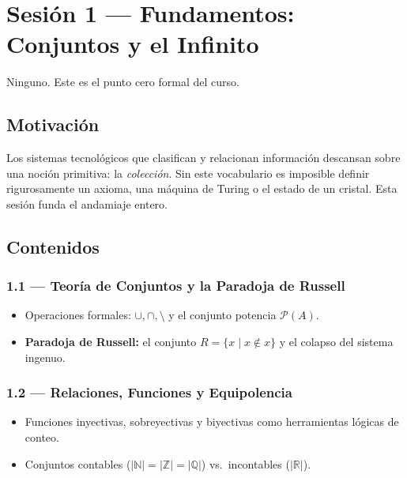 \documentclass[11pt, letterpaper]{article}
\begin{document}
\newpage

\section{Sesi\'on 1 --- Fundamentos: Conjuntos y el Infinito}

\begin{prereqs}
Ninguno. Este es el punto cero formal del curso.
\end{prereqs}

\subsection*{Motivaci\'on}
Los sistemas tecnol\'ogicos que clasifican y relacionan informaci\'on descansan sobre una noci\'on primitiva: la \emph{colecci\'on}. Sin este vocabulario es imposible definir rigurosamente un axioma, una m\'aquina de Turing o el estado de un cristal. Esta sesi\'on funda el andamiaje entero.

\subsection{Contenidos}

\subsubsection{1.1 --- Teor\'ia de Conjuntos y la Paradoja de Russell}
\begin{itemize}
  \item Operaciones formales: $\cup, \cap, \setminus$ y el conjunto potencia $\mathcal{P}(A)$.
  \item \textbf{Paradoja de Russell:} el conjunto $R=\{x \mid x\notin x\}$ y el colapso del sistema ingenuo.
\end{itemize}

\subsubsection{1.2 --- Relaciones, Funciones y Equipolencia}
\begin{itemize}
  \item Funciones inyectivas, sobreyectivas y biyectivas como herramientas l\'ogicas de conteo.
  \item Conjuntos contables ($|\mathbb{N}|=|\mathbb{Z}|=|\mathbb{Q}|$) vs.\ incontables ($|\mathbb{R}|$).
\end{itemize}
\end{document}
